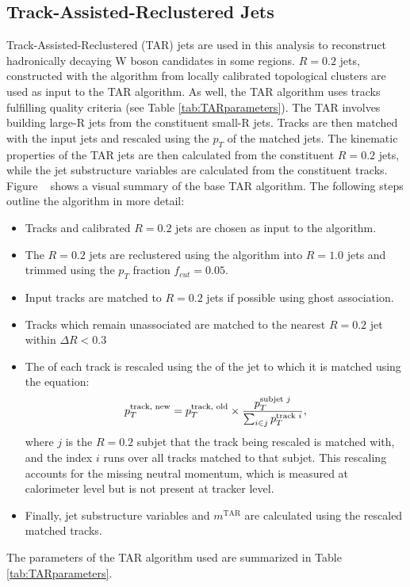 \subsection{Track-Assisted-Reclustered Jets}
\label{ap:TARjet_object_defs}
Track-Assisted-Reclustered (TAR) jets are used in this analysis to reconstruct hadronically decaying W boson candidates in some regions. $R=0.2$ jets, constructed with the \akt algorithm from locally calibrated topological clusters are used as input to the TAR algorithm. As well, the TAR algorithm uses tracks fulfilling quality criteria (see Table \ref{tab:TARparameters}). The TAR involves building large-R jets from the constituent small-R jets. Tracks are then matched with the input jets and rescaled using the $p_T$ of the matched jets. The kinematic properties of the TAR jets are then calculated from the constituent $R=0.2$ jets, while the jet substructure variables are calculated from the constituent tracks. Figure ~ shows a visual summary of the base TAR algorithm.
The following steps outline the algorithm in more detail:
\begin{itemize}
  \item Tracks and calibrated \akt $R=0.2$ jets are chosen as input to the algorithm.
  \item The \akt $R=0.2$ jets are reclustered using the \akt algorithm into $R=1.0$ jets and trimmed using the $p_T$ fraction \(f_{cut}=0.05\).
  \item Input tracks are matched to $R=0.2$ jets if possible using ghost association.
  \item Tracks which remain unassociated are matched to the nearest \akt $R=0.2$ jet within $\Delta R<0.3$
  \item The \pT of each track is rescaled using the \pT of the jet to which it is matched using the equation:
  \begin{equation}
  p_T^{\text{track, new}} = p_T^{\text{track, old}}\times \frac{p_T^{\text{subjet $j$}}}{\sum_{i \in j} p_T^{\text{track $i$}}} ,
  \label{eq:TAR_rescale}
  \end{equation}  where $j$ is the $R=0.2$ subjet that the track being rescaled is matched with, and the index $i$ runs over all tracks matched to that subjet. This rescaling accounts for the missing neutral momentum, which is measured at calorimeter level but is not present at tracker level.
  \item Finally, jet substructure variables and $m^\text{TAR}$ are calculated using the rescaled matched tracks.
\end{itemize}
The parameters of the TAR algorithm used are summarized in Table \ref{tab:TARparameters}. \\

